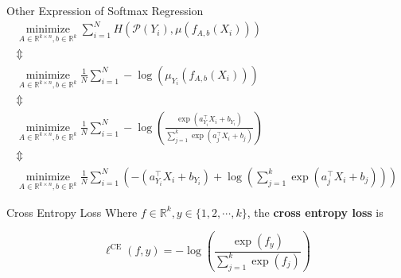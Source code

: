 \begin{frame}[allowframebreaks]

\begin{myconceptblock}{4.9}{Other Expression of Softmax Regression}
    $$
    \begin{gathered}
    \underset{A \in \mathbb{R}^{k \times n}, b \in \mathbb{R}^{k}}{\operatorname{minimize}} \sum_{i=1}^{N} H\left(\mathcal{P}\left(Y_{i}\right), \mu\left(f_{A, b}\left(X_{i}\right)\right)\right) \\
    \mathbb{\Updownarrow} \\
    \underset{A \in \mathbb{R}^{k \times n}, b \in \mathbb{R}^{k}}{\operatorname{minimize}} \frac{1}{N} \sum_{i=1}^{N}-\log \left(\mu_{Y_{i}}\left(f_{A, b}\left(X_{i}\right)\right)\right) \\
    \mathbb{\Updownarrow} \\
    \underset{A \in \mathbb{R}^{k \times n}, b \in \mathbb{R}^{k}}{\operatorname{minimize}} \frac{1}{N} \sum_{i=1}^{N}-\log \left(\frac{\exp \left(a_{Y_{i}}^{\top} X_{i}+b_{Y_{i}}\right)}{\sum_{j=1}^{k} \exp \left(a_{j}^{\top} X_{i}+b_{j}\right)}\right) \\
    \mathbb{\Updownarrow} \\
    \underset{A \in \mathbb{R}^{k \times n}, b \in \mathbb{R}^{k}}{\operatorname{minimize}} \frac{1}{N} \sum_{i=1}^{N}\left(-\left(a_{Y_{i}}^{\top} X_{i}+b_{Y_{i}}\right)+\log \left(\sum_{j=1}^{k} \exp \left(a_{j}^{\top} X_{i}+b_{j}\right)\right)\right)
    \end{gathered}
    $$
\end{myconceptblock}

\end{frame}

\begin{frame}[allowframebreaks]

\begin{mydefinitionblock}{4.10}{Cross Entropy Loss}
    Where $f \in \mathbb{R}^{k}, y \in \{1, 2, \cdots, k\}$, the \textbf{cross entropy loss} is

    $$
    \ell^{\mathrm{CE}}(f, y)=-\log \left(\frac{\exp \left(f_{y}\right)}{\sum_{j=1}^{k} \exp \left(f_{j}\right)}\right)
    $$
\end{mydefinitionblock}

\end{frame}

